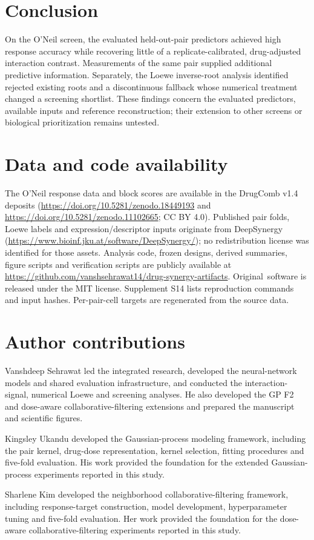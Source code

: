 \documentclass[11pt]{article}
\begin{document}
\section{Conclusion}\label{sec:conclusion}
On the O'Neil screen, the evaluated held-out-pair predictors achieved high response accuracy while recovering little of a replicate-calibrated, drug-adjusted interaction contrast. Measurements of the same pair supplied additional predictive information. Separately, the Loewe inverse-root analysis identified rejected existing roots and a discontinuous fallback whose numerical treatment changed a screening shortlist. These findings concern the evaluated predictors, available inputs and reference reconstruction; their extension to other screens or biological prioritization remains untested.

\section*{Data and code availability}
The O'Neil response data and block scores are available in the DrugComb v1.4 deposits (\url{https://doi.org/10.5281/zenodo.18449193} and \url{https://doi.org/10.5281/zenodo.11102665}; CC BY 4.0). Published pair folds, Loewe labels and expression/descriptor inputs originate from DeepSynergy (\url{https://www.bioinf.jku.at/software/DeepSynergy/}); no redistribution license was identified for those assets. Analysis code, frozen designs, derived summaries, figure scripts and verification scripts are publicly available at \url{https://github.com/vanshsehrawat14/drug-synergy-artifacts}. Original~software is released under the MIT license. Supplement S14 lists reproduction commands and input hashes. Per-pair-cell targets are regenerated from the source data.

\section*{Author contributions}
Vanshdeep Sehrawat led the integrated research, developed the neural-network models and shared evaluation infrastructure, and conducted the interaction-signal, numerical Loewe and screening analyses. He also developed the GP F2 and dose-aware collaborative-filtering extensions and prepared the manuscript and scientific figures.

Kingsley Ukandu developed the Gaussian-process modeling framework, including the pair kernel, drug-dose representation, kernel selection, fitting procedures and five-fold evaluation. His work provided the foundation for the extended Gaussian-process experiments reported in this study.

Sharlene Kim developed the neighborhood collaborative-filtering framework, including response-target construction, model development, hyperparameter tuning and five-fold evaluation. Her work provided the foundation for the dose-aware collaborative-filtering experiments reported in this study.

\begin{references}

\end{references}
\end{document}
